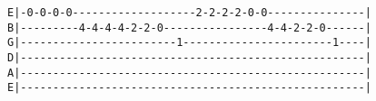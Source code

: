 \begin{lstlisting}
E|-0-0-0-0-------------------2-2-2-2-0-0---------------|
B|---------4-4-4-4-2-2-0----------------4-4-2-2-0------|
G|------------------------1-----------------------1----|
D|-----------------------------------------------------|
A|-----------------------------------------------------|
E|-----------------------------------------------------|
\end{lstlisting}
\vspace{2em}
\endsong
